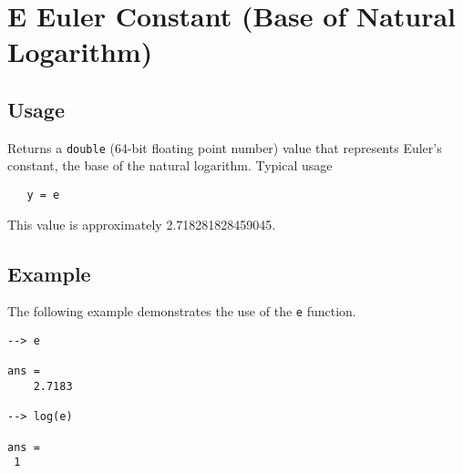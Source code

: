 \section{E Euler Constant (Base of Natural Logarithm)}

\subsection{Usage}

Returns a \verb|double| (64-bit floating point number) value that represents Euler's constant, the base of the natural logarithm.  Typical usage 
\begin{verbatim}
   y = e
\end{verbatim}
This value is approximately 2.718281828459045.
\subsection{Example}

The following example demonstrates the use of the \verb|e| function.
\begin{verbatim}
--> e

ans = 
    2.7183 

--> log(e)

ans = 
 1 
\end{verbatim}
